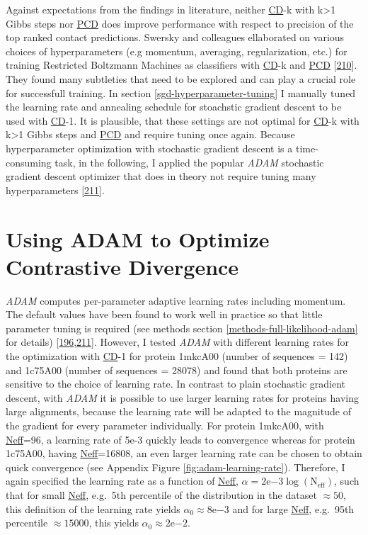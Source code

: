\documentclass[11pt,a4paper,twoside]{book}
\theoremstyle{definition}
\theoremstyle{definition}
\theoremstyle{remark}
\begin{document}
Against expectations from the findings in literature, neither
\protect\hyperlink{abbrev}{CD}-k with k\textgreater{}1 Gibbs steps nor
\protect\hyperlink{abbrev}{PCD} does improve performance with respect to
precision of the top ranked contact predictions. Swersky and colleagues
ellaborated on various choices of hyperparameters (e.g momentum,
averaging, regularization, etc.) for training Restricted Boltzmann
Machines as classifiers with \protect\hyperlink{abbrev}{CD}-k and
\protect\hyperlink{abbrev}{PCD}
{[}\protect\hyperlink{ref-Swersky2010}{210}{]}. They found many
subtleties that need to be explored and can play a crucial role for
successfull training. In section \ref{sgd-hyperparameter-tuning} I
manually tuned the learning rate and annealing schedule for stoachstic
gradient descent to be used with \protect\hyperlink{abbrev}{CD}-1. It is
plausible, that these settings are not optimal for
\protect\hyperlink{abbrev}{CD}-k with k\textgreater{}1 Gibbs steps and
\protect\hyperlink{abbrev}{PCD} and require tuning once again. Because
hyperparameter optimization with stochastic gradient descent is a
time-consuming task, in the following, I applied the popular \emph{ADAM}
stochastic gradient descent optimizer that does in theory not require
tuning many hyperparameters
{[}\protect\hyperlink{ref-Kingma2014}{211}{]}.

\section{Using ADAM to Optimize Contrastive
Divergence}\label{adam-results}

\emph{ADAM} computes per-parameter adaptive learning rates including
momentum. The default values have been found to work well in practice so
that little parameter tuning is required (see methods section
\ref{methods-full-likelihood-adam} for details)
{[}\protect\hyperlink{ref-Ruder2017}{196},\protect\hyperlink{ref-Kingma2014}{211}{]}.
However, I tested \emph{ADAM} with different learning rates for the
optimization with \protect\hyperlink{abbrev}{CD}-1 for protein 1mkcA00
(number of sequences = 142) and 1c75A00 (number of sequences = 28078)
and found that both proteins are sensitive to the choice of learning
rate. In contrast to plain stochastic gradient descent, with \emph{ADAM}
it is possible to use larger learning rates for proteins having large
alignments, because the learning rate will be adapted to the magnitude
of the gradient for every parameter individually. For protein 1mkcA00,
with \protect\hyperlink{abbrev}{Neff}=96, a learning rate of 5e-3
quickly leads to convergence whereas for protein 1c75A00, having
\protect\hyperlink{abbrev}{Neff}=16808, an even larger learning rate can
be chosen to obtain quick convergence (see Appendix Figure
\ref{fig:adam-learning-rate}). Therefore, I again specified the learning
rate as a function of \protect\hyperlink{abbrev}{Neff},
\(\alpha = 2\mathrm{e}{-3}\log(\text{N}_{\text{eff}})\), such that for
small \protect\hyperlink{abbrev}{Neff}, e.g.~5th percentile of the
distribution in the dataset \(\approx 50\), this definition of the
learning rate yields \(\alpha_0 \approx 8\mathrm{e}{-3}\) and for large
\protect\hyperlink{abbrev}{Neff}, e.g.~95th percentile
\(\approx 15000\), this yields \(\alpha_0 \approx 2\mathrm{e}{-2}\).
\end{document}
